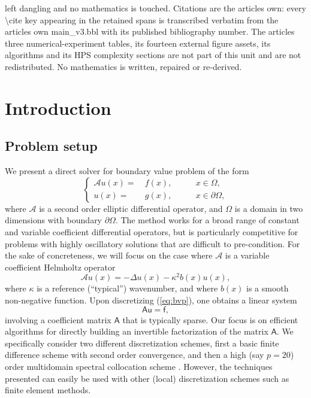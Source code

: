\documentclass[10pt,a4paper]{amsart}
\newcommand{\vct}[1]{\bm{\mathsf{#1}}}
\newcommand{\mtx}[1]{\bm{\mathsf{#1}}}
\begin{document}
left dangling and no mathematics is touched. Citations are the article\textquotesingle s own: every \textbackslash{}cite key appearing in the retained spans is transcribed verbatim from the article\textquotesingle s own main\_v3.bbl with its published bibliography number. The article\textquotesingle s three numerical-experiment tables, its fourteen external figure assets, its algorithms and its HPS complexity sections are not part of this unit and are not redistributed. No mathematics is written, repaired or re-derived.
\section{Introduction}

\subsection{Problem setup}
We present a direct solver for boundary value problem of the form
\begin{equation}
\label{eq:bvp}
\left\{\begin{aligned}
\mathcal A u(x) =&\ f(x),\qquad&x \in \Omega,\\
u(x) =&\ g(x),\qquad&x \in \partial \Omega,
\end{aligned}\right.
\end{equation}
where $\mathcal A$ is a second order elliptic differential operator,
and $\Omega$ is a domain in two dimensions with boundary $\partial \Omega$.
The method works for a broad range of constant and variable coefficient differential
operators, but is particularly competitive for problems with highly oscillatory solutions
that are difficult to pre-condition.
For the sake of concreteness, we will focus on the case where $\mathcal A$ is a variable
coefficient Helmholtz operator
\begin{equation}
\label{eq:var_helm}
\mathcal A u(x) = -\Delta u(x) - \kappa^{2}b(x)u(x),
\end{equation}
where $\kappa$ is a reference (``typical'') wavenumber,
and where $b(x)$ is a smooth non-negative function.
Upon discretizing (\ref{eq:bvp}), one obtains a linear system
\begin{equation}
\label{eq:Au=f}
\mtx{A}\vct{u} = \vct{f},
\end{equation}
involving a coefficient matrix $\mtx{A}$ that is typically sparse. 
Our focus is on efficient algorithms for directly
building an invertible factorization of the matrix $\mtx{A}$. We specifically consider
two different discretization schemes, first a basic finite difference scheme with
second order convergence, and then a high (say $p=20$) order multidomain 
spectral 
collocation scheme \cite[Ch.~25]{2019_martinsson_book}. 
However, the techniques presented can easily be used with other (local)
discretization schemes such as finite element methods.
\end{document}
